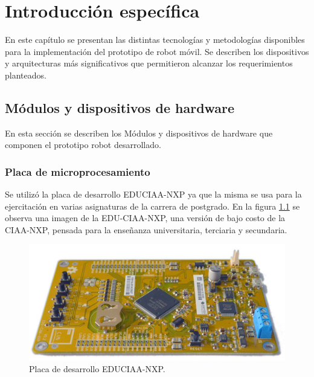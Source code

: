 \chapter{Introducción específica} %

\label{Chapter2}

En este capítulo se presentan las distintas tecnologías y metodologías disponibles para la implementación del prototipo de robot móvil. Se describen los dispositivos y arquitecturas más significativos que permitieron alcanzar los requerimientos planteados.

\section{Módulos y dispositivos de hardware}

En esta sección se describen los Módulos y dispositivos de hardware que componen el prototipo robot desarrollado.


\subsection{Placa de microprocesamiento}
Se utilizó  la placa de desarrollo EDUCIAA-NXP \citep{EDUCIAA} ya que la misma se usa para la ejercitación en varias asignaturas de la carrera de postgrado. En la figura \ref{fig:EDUCIAANXP} se observa una imagen de la EDU-CIAA-NXP, una versión de bajo costo de la CIAA-NXP, pensada para la enseñanza universitaria, terciaria y secundaria. 

\begin{figure}[htpb]
	\centering
	\includegraphics[width=\textwidth]{./Figures/EDUCIAANXP.jpg}
	\caption{Placa de desarrollo EDUCIAA-NXP\protect\footnotemark.}
	\label{fig:EDUCIAANXP}
\end{figure}

